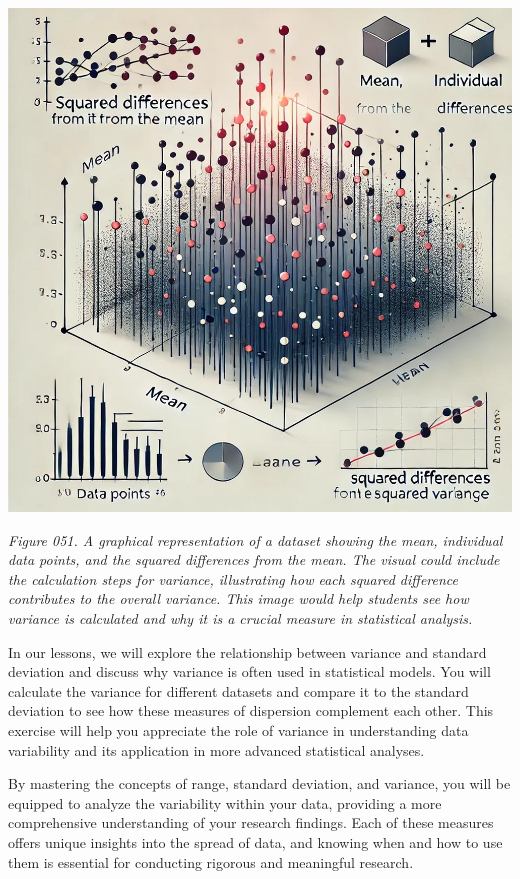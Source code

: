 \documentclass[
]{book}
\begin{document}
\includegraphics[width=1\textwidth,height=\textheight]{images/fig051.jpg}

\emph{Figure 051. A graphical representation of a dataset showing the mean, individual data points, and the squared differences from the mean. The visual could include the calculation steps for variance, illustrating how each squared difference contributes to the overall variance. This image would help students see how variance is calculated and why it is a crucial measure in statistical analysis.}

In our lessons, we will explore the relationship between variance and standard deviation and discuss why variance is often used in statistical models. You will calculate the variance for different datasets and compare it to the standard deviation to see how these measures of dispersion complement each other. This exercise will help you appreciate the role of variance in understanding data variability and its application in more advanced statistical analyses.

By mastering the concepts of range, standard deviation, and variance, you will be equipped to analyze the variability within your data, providing a more comprehensive understanding of your research findings. Each of these measures offers unique insights into the spread of data, and knowing when and how to use them is essential for conducting rigorous and meaningful research.
\end{document}
